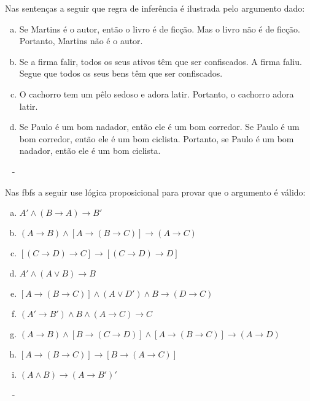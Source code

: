 \documentclass[a4paper, 12pt, addpoints]{exam}
\begin{document}
\begin{questions}
  \question Nas sentenças a seguir que regra de inferência é ilustrada pelo argumento dado:
  \begin{enumerate}[a)]
    \item Se Martins é o autor, então o livro é de ficção. Mas o livro não é de ficção. Portanto,
          Martins não é o autor.
    \item Se a firma falir, todos os seus ativos têm que ser confiscados. A firma faliu. Segue
          que todos os seus bens têm que ser confiscados.
    \item O cachorro tem um pêlo sedoso e adora latir. Portanto, o cachorro adora latir.
    \item Se Paulo é um bom nadador, então ele é um bom corredor. Se Paulo é um bom
          corredor, então ele é um bom ciclista. Portanto, se Paulo é um bom nadador, então ele
          é um bom ciclista.
  \end{enumerate}

  \begin{resp}~
    -
  \end{resp}

  \question Nas fbfs a seguir  use lógica proposicional para provar que o argumento é
  válido:

  \begin{enumerate}[a)]
    \item $A' \wedge (B \rightarrow A) \rightarrow B'$
    \item $(A \rightarrow B) \wedge [A \rightarrow (B \rightarrow C)] \rightarrow (A \rightarrow C)$
    \item $[(C \rightarrow D) \rightarrow C] \rightarrow [(C \rightarrow D) \rightarrow D]$
    \item $A' \wedge (A \vee B) \rightarrow B$
    \item $[A \rightarrow (B \rightarrow C)] \wedge (A \vee D') \wedge B \rightarrow (D \rightarrow C)$
    \item $(A' \rightarrow B') \wedge B \wedge (A \rightarrow C) \rightarrow C$
    \item $(A \rightarrow B) \wedge [B \rightarrow (C \rightarrow D)] \wedge [A \rightarrow (B \rightarrow C)] \rightarrow (A \rightarrow D)$
    \item $[A \rightarrow (B \rightarrow C)] \rightarrow [B \rightarrow (A \rightarrow C)]$
    \item $(A \wedge B) \rightarrow (A \rightarrow B')'$
  \end{enumerate}

  \begin{resp}~
    -
  \end{resp}



\end{questions}
\end{document}
